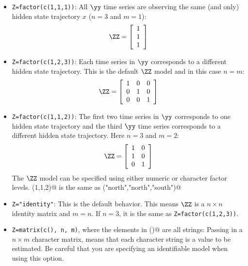 \begin{itemize}\itemsep5pt
\item[] \texttt{Z=factor(c(1,1,1))}:  All $\yy$ time series are observing the same (and only) hidden state trajectory $x$ ($n=3$ and $m=1$):
\begin{equation*}
 \ZZ =
 \left[ \begin{array}{c}
    1  \\
    1  \\
    1  
    \end{array} \right]  
\end{equation*}

\item[] \texttt{Z=factor(c(1,2,3))}:  Each time series in $\yy$ corresponds to a different hidden state trajectory.  This is the default $\ZZ$ model and in this case $n=m$:
\begin{equation*}
 \ZZ =
  \left[ \begin{array}{ccc}
    1 & 0 & 0 \\
    0 & 1 & 0 \\
    0 & 0 & 1 \end{array} \right]
\end{equation*}

\item[] \texttt{Z=factor(c(1,1,2))}: The first two time series in $\yy$ corresponds to one hidden state trajectory and the third $\yy$ time series corresponds to a different hidden state trajectory.  Here $n=3$ and $m=2$:
\begin{equation*}
 \ZZ =
  \left[ \begin{array}{cc}
    1 & 0  \\
    1 & 0  \\
    0 & 1  \end{array} \right]
\end{equation*}
The $\ZZ$ model can be specified using either numeric or character factor levels.  \verb@c(1,1,2)@ is the same as \verb@c("north","north","south")@

\item[] \texttt{Z="identity"}: This is the default behavior.  This means $\ZZ$ is a $n \times n$ identity matrix and $m=n$.  If $n=3$, it is the same as \texttt{Z=factor(c(1,2,3))}.

\item[] \texttt{Z=matrix(c(), n, m)}, where the elements in \verb@c()@ are all strings:  Passing in a $n \times m$ character matrix, means that each character string is a value to be estimated.  Be careful that you are specifying an identifiable model when using this option.


\end{itemize}
